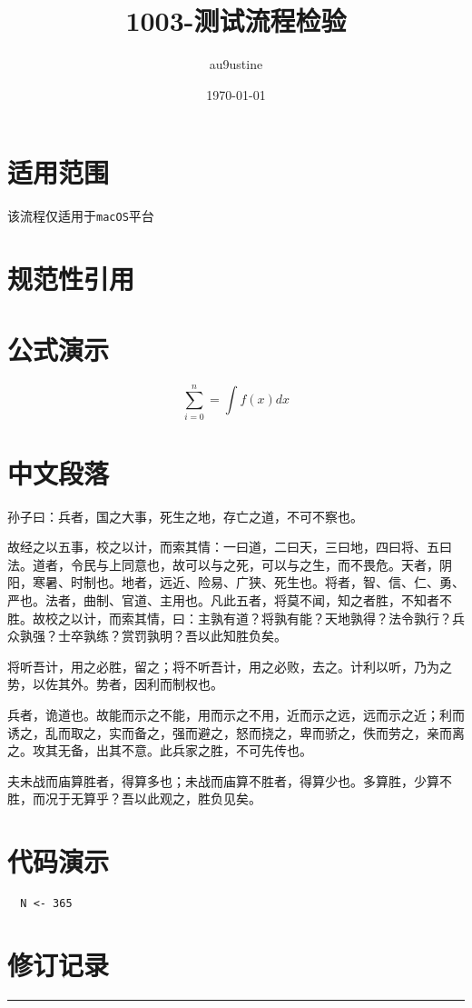 \documentclass[12pt,a4paper]{report}
\title{1003-测试流程检验}
\date{\today}
\author{au9ustine}
\begin{document}
\maketitle

\renewcommand{\contentsname}{目录}
\tableofcontents

\chapter{适用范围}
该流程仅适用于\texttt{macOS}平台

\chapter{规范性引用}

\chapter{公式演示}

\[ \sum_{i=0}^n = \int f(x) dx \]

\chapter{中文段落}
孙子曰：兵者，国之大事，死生之地，存亡之道，不可不察也。

故经之以五事，校之以计，而索其情：一曰道，二曰天，三曰地，四曰将、五曰法。道者，令民与上同意也，故可以与之死，可以与之生，而不畏危。天者，阴阳，寒暑、时制也。地者，远近、险易、广狭、死生也。将者，智、信、仁、勇、严也。法者，曲制、官道、主用也。凡此五者，将莫不闻，知之者胜，不知者不胜。故校之以计，而索其情，曰：主孰有道？将孰有能？天地孰得？法令孰行？兵众孰强？士卒孰练？赏罚孰明？吾以此知胜负矣。

将听吾计，用之必胜，留之；将不听吾计，用之必败，去之。计利以听，乃为之势，以佐其外。势者，因利而制权也。

兵者，诡道也。故能而示之不能，用而示之不用，近而示之远，远而示之近；利而诱之，乱而取之，实而备之，强而避之，怒而挠之，卑而骄之，佚而劳之，亲而离之。攻其无备，出其不意。此兵家之胜，不可先传也。

夫未战而庙算胜者，得算多也；未战而庙算不胜者，得算少也。多算胜，少算不胜，而况于无算乎？吾以此观之，胜负见矣。

\chapter{代码演示}
\begin{lstlisting}
  N <- 365
\end{lstlisting}

\appendix
\renewcommand{\contentsname}{附录}
\setlength{\parindent}{0pt}
\chapter{修订记录}

\rule[-0.3em]{0.38em}{1.1em}%
\end{document}
